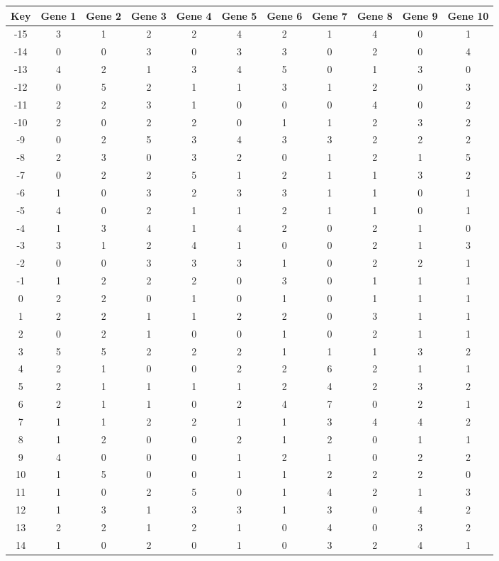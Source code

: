 \begin{tabular}{|c|c|c|c|c|c|c|c|c|c|c|}
\hline
Key & Gene 1 & Gene 2 & Gene 3 & Gene 4 & Gene 5 & Gene 6 & Gene 7 & Gene 8 & Gene 9 & Gene 10 \\
\hline
-15 & 3 & 1 & 2 & 2 & 4 & 2 & 1 & 4 & 0 & 1 \\
-14 & 0 & 0 & 3 & 0 & 3 & 3 & 0 & 2 & 0 & 4 \\
-13 & 4 & 2 & 1 & 3 & 4 & 5 & 0 & 1 & 3 & 0 \\
-12 & 0 & 5 & 2 & 1 & 1 & 3 & 1 & 2 & 0 & 3 \\
-11 & 2 & 2 & 3 & 1 & 0 & 0 & 0 & 4 & 0 & 2 \\
-10 & 2 & 0 & 2 & 2 & 0 & 1 & 1 & 2 & 3 & 2 \\
-9 & 0 & 2 & 5 & 3 & 4 & 3 & 3 & 2 & 2 & 2 \\
-8 & 2 & 3 & 0 & 3 & 2 & 0 & 1 & 2 & 1 & 5 \\
-7 & 0 & 2 & 2 & 5 & 1 & 2 & 1 & 1 & 3 & 2 \\
-6 & 1 & 0 & 3 & 2 & 3 & 3 & 1 & 1 & 0 & 1 \\
-5 & 4 & 0 & 2 & 1 & 1 & 2 & 1 & 1 & 0 & 1 \\
-4 & 1 & 3 & 4 & 1 & 4 & 2 & 0 & 2 & 1 & 0 \\
-3 & 3 & 1 & 2 & 4 & 1 & 0 & 0 & 2 & 1 & 3 \\
-2 & 0 & 0 & 3 & 3 & 3 & 1 & 0 & 2 & 2 & 1 \\
-1 & 1 & 2 & 2 & 2 & 0 & 3 & 0 & 1 & 1 & 1 \\
0 & 2 & 2 & 0 & 1 & 0 & 1 & 0 & 1 & 1 & 1 \\
1 & 2 & 2 & 1 & 1 & 2 & 2 & 0 & 3 & 1 & 1 \\
2 & 0 & 2 & 1 & 0 & 0 & 1 & 0 & 2 & 1 & 1 \\
3 & 5 & 5 & 2 & 2 & 2 & 1 & 1 & 1 & 3 & 2 \\
4 & 2 & 1 & 0 & 0 & 2 & 2 & 6 & 2 & 1 & 1 \\
5 & 2 & 1 & 1 & 1 & 1 & 2 & 4 & 2 & 3 & 2 \\
6 & 2 & 1 & 1 & 0 & 2 & 4 & 7 & 0 & 2 & 1 \\
7 & 1 & 1 & 2 & 2 & 1 & 1 & 3 & 4 & 4 & 2 \\
8 & 1 & 2 & 0 & 0 & 2 & 1 & 2 & 0 & 1 & 1 \\
9 & 4 & 0 & 0 & 0 & 1 & 2 & 1 & 0 & 2 & 2 \\
10 & 1 & 5 & 0 & 0 & 1 & 1 & 2 & 2 & 2 & 0 \\
11 & 1 & 0 & 2 & 5 & 0 & 1 & 4 & 2 & 1 & 3 \\
12 & 1 & 3 & 1 & 3 & 3 & 1 & 3 & 0 & 4 & 2 \\
13 & 2 & 2 & 1 & 2 & 1 & 0 & 4 & 0 & 3 & 2 \\
14 & 1 & 0 & 2 & 0 & 1 & 0 & 3 & 2 & 4 & 1 \\
\hline
\end{tabular}